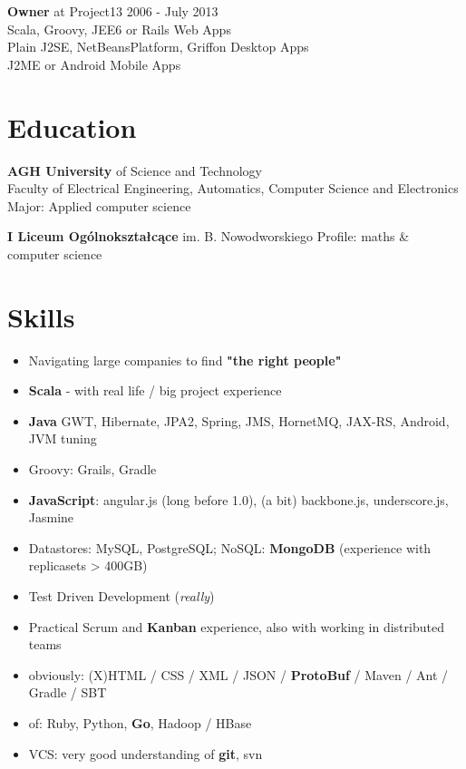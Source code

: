 \documentclass{res}
\begin{document}
\begin{resume}
{\bf Owner} at Project13 \hfill 2006 - July 2013\\
	Scala, Groovy, JEE6 or Rails Web Apps \\
	Plain J2SE, NetBeansPlatform, Griffon Desktop Apps \\
	J2ME or Android Mobile Apps 

\section{Education} 
{\bf AGH University} of Science and Technology\\ 
	Faculty of Electrical Engineering, Automatics, Computer Science and Electronics\\
	Major: Applied computer science

{\bf I Liceum Ogólnokształcące} im. B. Nowodworskiego 
	Profile: maths \& computer science

\section{Skills}
\begin{itemize}
 \item Navigating large companies to find \textbf{"the right people"}
 \item \textbf{Scala} - with real life / big project experience
 \item \textbf{Java} GWT, Hibernate, JPA2, Spring, JMS, HornetMQ, JAX-RS, Android, JVM tuning
 \item Groovy: Grails, Gradle
 \item \textbf{JavaScript}: angular.js (long before 1.0), (a bit) backbone.js, underscore.js, Jasmine
 \item Datastores: MySQL, PostgreSQL; NoSQL: \textbf{MongoDB} (experience with replicasets > 400GB)
 \item Test Driven Development (\textit{really})
 \item Practical Scrum and \textbf{Kanban} experience, also with working in distributed teams
 \item obviously: (X)HTML / CSS / XML / JSON / \textbf{ProtoBuf} / Maven / Ant / Gradle / SBT
 \item of: Ruby, Python, \textbf{Go}, Hadoop / HBase
 \item VCS: very good understanding of \textbf{git}, svn
\end{itemize}


\end{resume}
\end{document}
